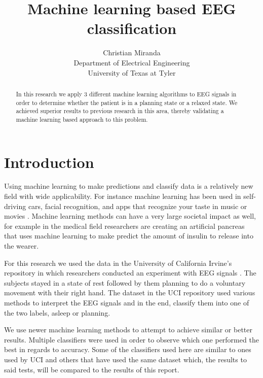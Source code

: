 \documentclass[conference,compsoc]{IEEEtran}
\begin{document}
\author{Christian Miranda\\Department of Electrical Engineering\\University of Texas at Tyler}
\title{Machine learning based EEG classification}
\maketitle

\begin{abstract}
In this research we apply 3 different machine learning algorithms to EEG signals in order to determine whether the patient is in a planning state or a relaxed state.  We achieved superior results to previous research in this area, thereby validating a machine learning based approach to this problem.

\end{abstract}

\section{Introduction}
Using machine learning to make predictions and classify data is a relatively new field with wide applicability.  For instance machine learning has been used in self-driving cars, facial recognition, and apps that recognize your taste in music or movies \cite{machine} \cite{cars}.  Machine learning methods can have a very large societal impact as well, for example in the medical field researchers are creating an artificial pancreas that uses machine learning \cite{diabetes} to make predict the amount of insulin to release into the wearer.

For this research we used the data in the University of California Irvine's repository in which researchers conducted an experiment with EEG signals \cite{classsvm}.  The subjects stayed in a state of rest followed by them planning to do a voluntary movement with their right hand. The dataset in the UCI repository used various methods to interpret the EEG signals and in the end, classify them into one of the two labels, asleep or planning. 

We use newer machine learning methods to attempt to achieve similar or better results. Multiple classifiers were used in order to observe which one performed the best in regards to accuracy. Some of the classifiers used here are similar to ones used by UCI and others that have used the same dataset \cite{fuzzy} which, the results to said tests, will be compared to the results of this report.
\end{document}
